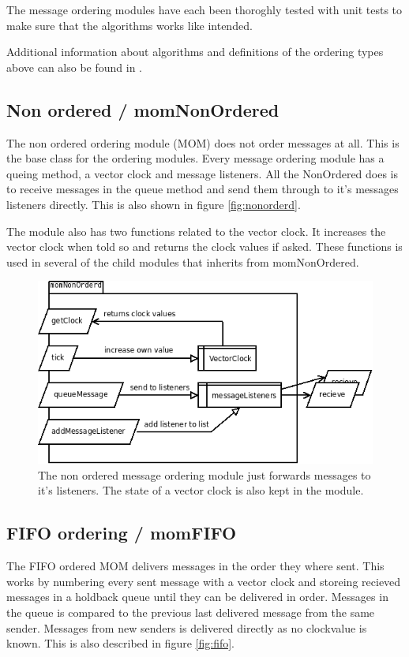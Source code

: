 \documentclass[english]{article}
\begin{document}
The message ordering modules have each been thoroghly tested with unit tests to make sure that the algorithms works like intended.

Additional information about algorithms and definitions of the ordering types above can also be found in \cite{distsys-ordering}.

\subsection{Non ordered / momNonOrdered}
The non ordered ordering module (MOM) does not order messages at all. This is the base class for the ordering modules. Every message ordering module has a queing method, a vector clock and message listeners. All the NonOrdered does is to receive messages in the queue method and send them through to it's messages listeners directly. This is also shown in figure \vref{fig:nonorderd}.

The module also has two functions related to the vector clock. It increases the vector clock when told so and returns the clock values if asked. These functions is used in several of the child modules that inherits from momNonOrdered.

\begin{figure}
\includegraphics[width=\textwidth]{momNonOrderd.png}
\caption{The non ordered message ordering module just forwards messages to it's listeners. The state of a vector clock is also kept in the module.}
\label{fig:nonorderd}
\end{figure}

\subsection{FIFO ordering / momFIFO}
\label{mo-fifo}
The FIFO ordered MOM delivers messages in the order they where sent. This works by numbering every sent message with a vector clock and storeing recieved messages in a holdback queue until they can be delivered in order. Messages in the queue is compared to the previous last delivered message from the same sender. Messages from new senders is delivered directly as no clockvalue is known. This is also described in figure \vref{fig:fifo}.
\end{document}

